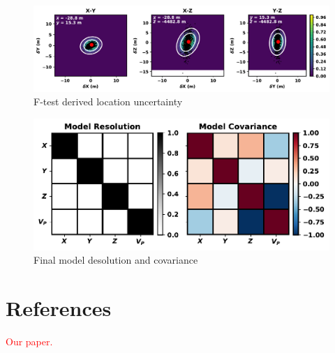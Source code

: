 \documentclass[titlepage, 12pt]{article}
\begin{document}
  \begin{figure}[!htb]
   \includegraphics[width=\linewidth]{ftest.pdf}
   \caption{F-test derived location uncertainty}
  \end{figure}
  
  \begin{figure}[!htb]
   \centering
   \includegraphics[width=0.9\linewidth]{resolution_matrices.pdf}
   \caption{Final model desolution and covariance}
  \end{figure}

 \section*{References}
 \textcolor{red}{Our paper.}
\end{document}
